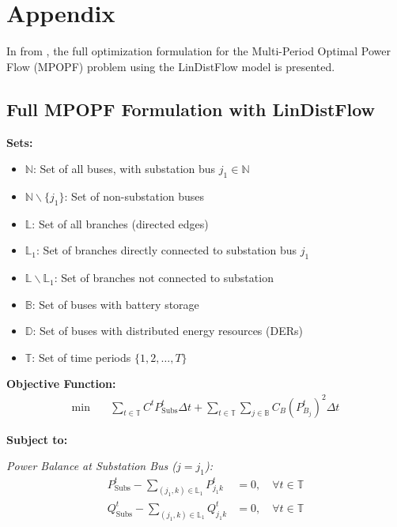 \newpage

\appendix
\section*{Appendix}
\label{sec:appendix}

In  from , the full optimization formulation for the Multi-Period Optimal Power Flow (MPOPF) problem using the LinDistFlow model is presented.


\subsection{Full MPOPF Formulation with LinDistFlow}
\label{subsec:full-mpopf-lindistflow}

\textbf{Sets:}
\begin{itemize}
    \item $\mathbb{N}$: Set of all buses, with substation bus $j_1 \in \mathbb{N}$
    \item $\mathbb{N} \backslash \{j_1\}$: Set of non-substation buses
    \item $\mathbb{L}$: Set of all branches (directed edges)
    \item $\mathbb{L}_1$: Set of branches directly connected to substation bus $j_1$
    \item $\mathbb{L} \backslash \mathbb{L}_1$: Set of branches not connected to substation
    \item $\mathbb{B}$: Set of buses with battery storage
    \item $\mathbb{D}$: Set of buses with distributed energy resources (DERs)
    \item $\mathbb{T}$: Set of time periods $\{1, 2, \ldots, T\}$
\end{itemize}

\textbf{Objective Function:}
\begin{align}
    \min \quad & \sum_{t \in \mathbb{T}} C^t P^t_{\text{Subs}} \Delta t 
    + \sum_{t \in \mathbb{T}} \sum_{j \in \mathbb{B}} C_B (P_{B_j}^t)^2 \Delta t \label{eq:objfun-cost-of-substation-power-ldf}
\end{align}

\textbf{Subject to:}

\textit{Power Balance at Substation Bus ($j = j_1$):}
\begin{align}
    P^t_{\text{Subs}} - \sum_{(j_1, k) \in \mathbb{L}_1} P_{j_1 k}^t &= 0, \quad \forall t \in \mathbb{T} \label{eq:substation-power-real-ldf} \\
    Q^t_{\text{Subs}} - \sum_{(j_1, k) \in \mathbb{L}_1} Q_{j_1 k}^t &= 0, \quad \forall t \in \mathbb{T} \label{eq:subs-reactive-ldf}
\end{align}

